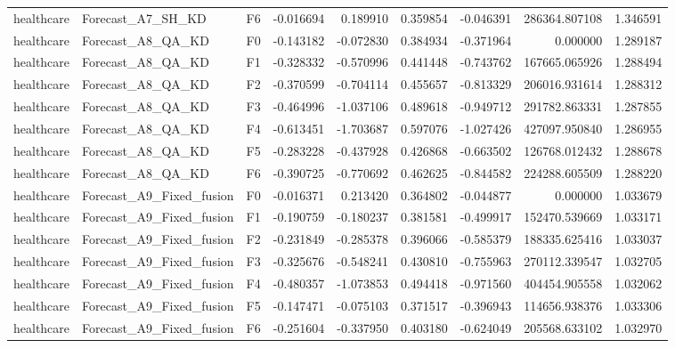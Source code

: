 \begin{tabular}{lllrrrrrr}
healthcare &            Forecast\_A7\_SH\_KD &  F6 & -0.016694 &  0.189910 & 0.359854 & -0.046391 &    286364.807108 &             1.346591 \\
healthcare &            Forecast\_A8\_QA\_KD &  F0 & -0.143182 & -0.072830 & 0.384934 & -0.371964 &         0.000000 &             1.289187 \\
healthcare &            Forecast\_A8\_QA\_KD &  F1 & -0.328332 & -0.570996 & 0.441448 & -0.743762 &    167665.065926 &             1.288494 \\
healthcare &            Forecast\_A8\_QA\_KD &  F2 & -0.370599 & -0.704114 & 0.455657 & -0.813329 &    206016.931614 &             1.288312 \\
healthcare &            Forecast\_A8\_QA\_KD &  F3 & -0.464996 & -1.037106 & 0.489618 & -0.949712 &    291782.863331 &             1.287855 \\
healthcare &            Forecast\_A8\_QA\_KD &  F4 & -0.613451 & -1.703687 & 0.597076 & -1.027426 &    427097.950840 &             1.286955 \\
healthcare &            Forecast\_A8\_QA\_KD &  F5 & -0.283228 & -0.437928 & 0.426868 & -0.663502 &    126768.012432 &             1.288678 \\
healthcare &            Forecast\_A8\_QA\_KD &  F6 & -0.390725 & -0.770692 & 0.462625 & -0.844582 &    224288.605509 &             1.288220 \\
healthcare &     Forecast\_A9\_Fixed\_fusion &  F0 & -0.016371 &  0.213420 & 0.364802 & -0.044877 &         0.000000 &             1.033679 \\
healthcare &     Forecast\_A9\_Fixed\_fusion &  F1 & -0.190759 & -0.180237 & 0.381581 & -0.499917 &    152470.539669 &             1.033171 \\
healthcare &     Forecast\_A9\_Fixed\_fusion &  F2 & -0.231849 & -0.285378 & 0.396066 & -0.585379 &    188335.625416 &             1.033037 \\
healthcare &     Forecast\_A9\_Fixed\_fusion &  F3 & -0.325676 & -0.548241 & 0.430810 & -0.755963 &    270112.339547 &             1.032705 \\
healthcare &     Forecast\_A9\_Fixed\_fusion &  F4 & -0.480357 & -1.073853 & 0.494418 & -0.971560 &    404454.905558 &             1.032062 \\
healthcare &     Forecast\_A9\_Fixed\_fusion &  F5 & -0.147471 & -0.075103 & 0.371517 & -0.396943 &    114656.938376 &             1.033306 \\
healthcare &     Forecast\_A9\_Fixed\_fusion &  F6 & -0.251604 & -0.337950 & 0.403180 & -0.624049 &    205568.633102 &             1.032970 \\

\end{tabular}

